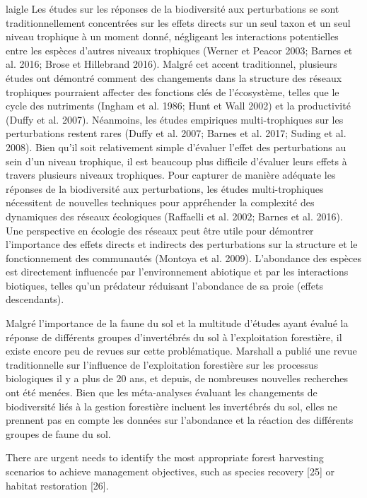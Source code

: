 laigle
Les études sur les réponses de la biodiversité aux perturbations se sont traditionnellement concentrées sur les effets directs sur un seul taxon et un seul niveau trophique à un moment donné, 
négligeant les interactions potentielles entre les espèces d'autres niveaux trophiques (Werner et Peacor 2003; Barnes et al. 2016; Brose et Hillebrand 2016). 
Malgré cet accent traditionnel, plusieurs études ont démontré comment des changements dans la structure des réseaux trophiques pourraient affecter des fonctions clés de l'écosystème, telles que le cycle des nutriments (Ingham et al. 1986; Hunt et Wall 2002) et la productivité (Duffy et al. 2007). 
Néanmoins, les études empiriques multi-trophiques sur les perturbations restent rares (Duffy et al. 2007; Barnes et al. 2017; Suding et al. 2008). Bien qu'il soit relativement simple d'évaluer l'effet des perturbations au sein d'un niveau trophique, il est beaucoup plus difficile d'évaluer leurs effets à travers plusieurs niveaux trophiques. Pour capturer de manière adéquate les réponses de la biodiversité aux perturbations, les études multi-trophiques nécessitent de nouvelles techniques pour appréhender la complexité des dynamiques des réseaux écologiques (Raffaelli et al. 2002; Barnes et al. 2016). Une perspective en écologie des réseaux peut être utile pour démontrer l'importance des effets directs et indirects des perturbations sur la structure et le fonctionnement des communautés (Montoya et al. 2009). 
L'abondance des espèces est directement influencée par l'environnement abiotique et par les interactions biotiques, telles qu'un prédateur réduisant l'abondance de sa proie (effets descendants).


Malgré l'importance de la faune du sol et la multitude d'études ayant évalué la réponse de différents groupes d'invertébrés du sol à l'exploitation forestière, il existe encore peu de revues sur cette problématique. 
Marshall a publié une revue traditionnelle sur l'influence de l'exploitation forestière sur les processus biologiques il y a plus de 20 ans, et depuis, de nombreuses nouvelles recherches ont été menées. 
Bien que les méta-analyses évaluant les changements de biodiversité liés à la gestion forestière incluent les invertébrés du sol, elles ne prennent pas en compte les données sur l'abondance et la réaction des différents groupes de faune du sol.


There are urgent needs to identify the most appropriate forest harvesting scenarios to achieve management objectives, such as species recovery [25] or habitat restoration [26].

